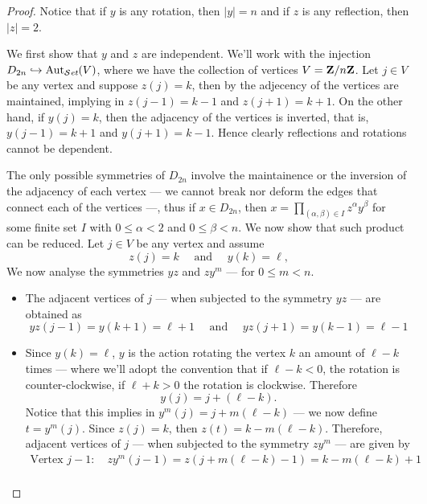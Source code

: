 \begin{proof}
  Notice that if \(y\) is any rotation, then \(|y| = n\) and if \(z\) is any
  reflection, then \(|z| = 2\).

  We first show that \(y\) and \(z\) are independent. We'll work with the
  injection \(D_{2n} \hookrightarrow \operatorname{Aut}_{\mathcal{S}\textit{et}}(V)\), where we have the collection of
  vertices \(V = \mathbf{Z}/n\mathbf{Z}\). Let \(j \in V\) be any vertex and suppose \(z(j) =
  k\), then by the adjecency of the vertices are maintained, implying in \(z(j -
  1) = k - 1\) and \(z(j + 1) = k + 1\). On the other hand, if \(y(j) = k\),
  then the adjacency of the vertices is inverted, that is, \(y(j - 1) = k + 1\)
  and \(y(j + 1) = k - 1\). Hence clearly reflections and rotations cannot be
  dependent.

  The only possible symmetries of \(D_{2n}\) involve the maintainence or the
  inversion of the adjacency of each vertex --- we cannot break nor deform the
  edges that connect each of the vertices ---, thus if \(x \in D_{2n}\), then
  \(x = \prod_{(\alpha, \beta) \in I} z^\alpha y^\beta\) for some finite set
  \(I\) with \(0 \leq \alpha < 2\) and \(0 \leq \beta < n\). We now show that such
  product can be reduced. Let \(j \in V\) be any vertex and assume
  \[
    z(j) = k
    \quad\text{ and }\quad
    y(k) = \ell,
  \]
  We now analyse the symmetries \(y z\) and \(z y^m\) --- for \(0 \leq m < n\).
  \begin{itemize}
    \item The adjacent vertices of \(j\) --- when subjected to the symmetry \(y
      z\) --- are obtained as
      \[
        y z(j - 1) = y(k + 1) = \ell + 1
        \quad\text{ and }\quad
        y z(j + 1) = y(k - 1) = \ell - 1
      \]
    \item Since \(y(k) = \ell\), \(y\) is the action rotating the vertex \(k\)
      an amount of \(\ell - k\) times  --- where we'll adopt the convention that
      if \(\ell - k < 0\), the rotation is counter-clockwise, if \(\ell + k >
      0\) the rotation is clockwise. Therefore
      \[
        y(j) = j + (\ell - k).
      \]
      Notice that this implies in \(y^m(j) = j + m(\ell - k)\) --- we now define
      \(t = y^m(j)\). Since \(z(j) = k\), then \(z(t) = k - m(\ell - k)\).
      Therefore, adjacent vertices of \(j\) --- when subjected to the symmetry
      \(z y^m\) --- are given by
      \begin{gather*}
        \text{Vertex } j - 1: \quad
        z y^m(j - 1) = z(j + m (\ell - k) - 1) = k - m(\ell - k) + 1 \\

\end{gather*}
\end{itemize}
\end{proof}
